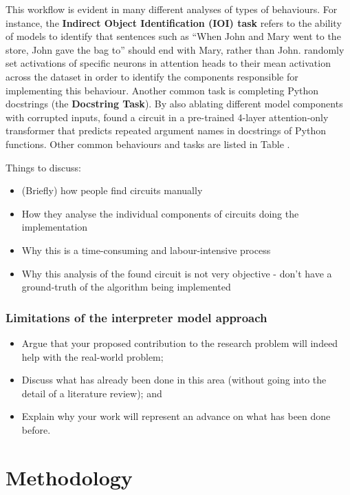 \documentclass[11pt]{scrartcl}
\begin{document}
This workflow is evident in many different analyses of types of behaviours. For instance, the \textbf{Indirect Object Identification (IOI) task} refers to the ability of models to identify that sentences such as ``When John and Mary went to the store, John gave the bag to'' should end with Mary, rather than John. \textcite{wang2022interpretability} randomly set activations of specific neurons in attention heads to their mean activation across the dataset in order to identify the components responsible for implementing this behaviour. Another common task is completing Python docstrings (the \textbf{Docstring Task}). By also ablating different model components with corrupted inputs, \textcite{heimersheim2023circuit} found a circuit in a pre-trained 4-layer attention-only transformer that predicts repeated argument names in docstrings of Python functions. Other common behaviours and tasks are listed in Table . 


\color{blue}
Things to discuss:
\begin{itemize}
\item (Briefly) how people find circuits manually
\item How they analyse the individual components of circuits doing the implementation
\item Why this is a time-consuming and labour-intensive process
\item Why this analysis of the found circuit is not very objective - don't have a ground-truth of the algorithm being implemented
\end{itemize}
\color{black}


\subsubsection{Limitations of the interpreter model approach}

\color{blue}
\begin{itemize}
\item Argue that your proposed contribution to the research problem will indeed
help with the real-world problem;
\item Discuss what has already been done in this area (without going into the detail of a literature review); and
\item Explain why your work will represent an advance on what has been done
before.
\end{itemize}
\color{black}



\section{Methodology}
\end{document}
